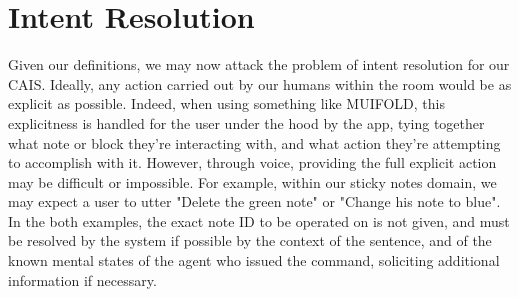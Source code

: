 \section{Intent Resolution}

Given our definitions, we may now attack the problem of intent resolution for our CAIS.
Ideally, any action carried out by our humans within the room would be as explicit
as possible. Indeed, when using something like MUIFOLD, this explicitness is handled for
the user under the hood by the app, tying together what note or block they're interacting
with, and what action they're attempting to accomplish with it. However, through voice,
providing the full explicit action may be difficult or impossible. For example, within
our sticky notes domain, we may expect a user to utter "Delete the green note" or "Change
his note to blue". In the both examples, the exact note ID to be operated on is not given,
and must be resolved by the system if possible by the context of the sentence, and of the
known mental states of the agent who issued the command, soliciting additional information
if necessary.